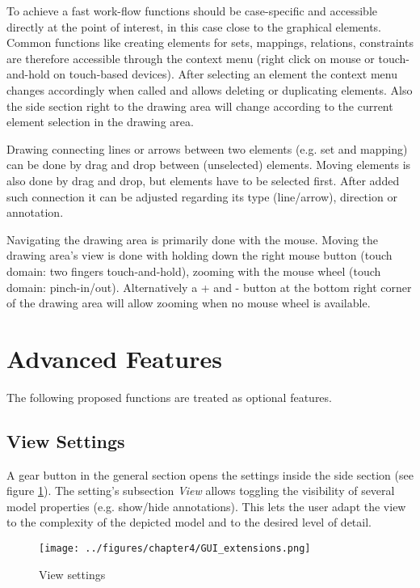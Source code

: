 \documentclass[twoside, openright, 12pt]{book}
\begin{document}
To achieve a fast work-flow functions should be case-specific and accessible directly at the point of interest, in this case close to the graphical elements.
Common functions like creating elements for sets, mappings, relations, constraints are therefore accessible through the context menu (right click on mouse or touch-and-hold on touch-based devices).
After selecting an element the context menu changes accordingly when called and allows deleting or duplicating elements.
Also the side section right to the drawing area will change according to the current element selection in the drawing area.

Drawing connecting lines or arrows between two elements (e.g. set and mapping) can be done by drag and drop between (unselected) elements.
Moving elements is also done by drag and drop, but elements have to be selected first.
After added such connection it can be adjusted regarding its type (line/arrow), direction or annotation.

Navigating the drawing area is primarily done with the mouse.
Moving the drawing area's view is done with holding down the right mouse button (touch domain: two fingers touch-and-hold), zooming with the mouse wheel (touch domain: pinch-in/out).
Alternatively a + and - button at the bottom right corner of the drawing area will allow zooming when no mouse wheel is available.




\section{Advanced Features}
\label{editor_extensions}
The following proposed functions are treated as optional features.

\subsection{View Settings}
\label{editor_extension_settings}
A gear button in the general section opens the settings inside the side section (see figure \ref{fig:GUI_extensions}).
The setting's subsection \textit{View} allows toggling the visibility of several model properties (e.g. show/hide annotations).
This lets the user adapt the view to the complexity of the depicted model and to the desired level of detail.

\begin{figure}[htb]
	\centering
	\texttt{[image: ../figures/chapter4/GUI\_extensions.png]}
	\caption{View settings}
	\label{fig:GUI_extensions}
\end{figure}
\end{document}
